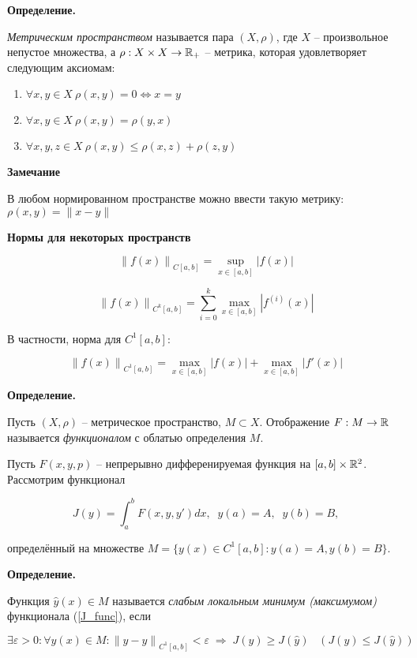 \setcounter{equation}{0}
\textbf{Определение.}

\textit{Метрическим пространством} называется пара $(X, \rho)$, где 
$X$ -- произвольное непустое множества, а $\rho: X \times X \to \mathbb{R}_+$ -- метрика, которая
удовлетворяет следующим аксиомам:

\begin{enumerate}
    \item $\forall x, y \in X\ \rho(x, y) = 0 \Leftrightarrow x = y$
    \item $\forall x, y \in X\ \rho(x, y) = \rho(y, x)$
    \item $\forall x, y, z \in X\ \rho(x, y) \leqslant \rho(x, z) + \rho(z, y)$
\end{enumerate}

\textbf{Замечание}

В любом нормированном пространстве можно ввести такую метрику:
$\rho(x, y) = \| x - y \|$

\textbf{Нормы для некоторых пространств}

$$
    \left\| f(x) \right\|_{C [a, b]} = \sup_{x \in [a, b]} \left| f(x) \right|
$$

$$
    \left\| f(x) \right\|_{C^k [a, b]} = 
    \sum_{i = 0}^k \max_{x \in [a, b]} \left| f^{(i)} (x) \right|
$$

В частности, норма для $C^1 [a, b]$:

$$
    \left\| f(x) \right\|_{C^1 [a, b]} = 
    \max_{x \in [a, b]} \left| f(x) \right| + 
    \max_{x \in [a, b]} \left| f'(x) \right|
$$

\textbf{Определение.}

Пусть $(X, \rho)$ -- метрическое пространство, $M \subset X$.
Отображение $F: M \to \mathbb{R}$ называется \textit{функционалом}
с облатью определения $M$.

Пусть $F(x, y, p)$ -- непрерывно дифференируемая функция на 
$[a, b] \times \mathbb{R}^2$. Рассмотрим функционал 

\begin{equation}\label{J_func}
    J(y) = \int_a^b F(x, y, y')dx, \;\;y(a) = A,\;\; y(b) = B,
\end{equation}

определённый на множестве 
$M = \{ y(x) \in C^1 [a, b]: y(a) = A, y(b) = B\}$.

\textbf{Определение.}

Функция $\widehat{y}(x) \in M$ называется \textit{слабым локальным минимум (максимумом)}
функционала (\ref{J_func}), если

$$
\exists \varepsilon > 0 : \forall y(x) \in M : 
\left\| y - \widehat{y} \right\|_{C^1 [a, b]} < \varepsilon \; \Rightarrow \;
J(y) \geqslant J(\widehat{y}) \;\;\;\left( J(y) \leqslant J(\widehat{y}) \right)
$$


